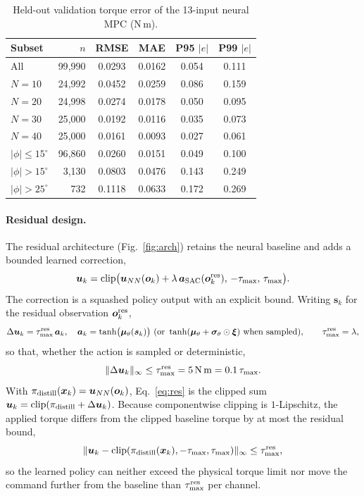 \documentclass[preprint,12pt,authoryear=false]{elsarticle}
\theoremstyle{remark}\newtheorem{remark}{Remark}
\theoremstyle{plain}\newtheorem{proposition}{Proposition}\newtheorem{lemma}{Lemma}
\theoremstyle{definition}\newtheorem{assumption}{Assumption}
\newcommand{\tmax}{\tau_{\max}}
\begin{document}
\begin{table}[t]\centering\small
\caption{Held-out validation torque error of the 13-input neural MPC (N\,m).}\label{tab:val13}
\begin{tabular}{lrcccc}\toprule
Subset & $n$ & RMSE & MAE & P95 $|e|$ & P99 $|e|$\\\midrule
All & 99{,}990 & 0.0293 & 0.0162 & 0.054 & 0.111\\
$N=10$ & 24{,}992 & 0.0452 & 0.0259 & 0.086 & 0.159\\
$N=20$ & 24{,}998 & 0.0274 & 0.0178 & 0.050 & 0.095\\
$N=30$ & 25{,}000 & 0.0192 & 0.0116 & 0.035 & 0.073\\
$N=40$ & 25{,}000 & 0.0161 & 0.0093 & 0.027 & 0.061\\
$|\phi|\le15^\circ$ & 96{,}860 & 0.0260 & 0.0151 & 0.049 & 0.100\\
$|\phi|>15^\circ$ & 3{,}130 & 0.0803 & 0.0476 & 0.143 & 0.249\\
$|\phi|>25^\circ$ & 732 & 0.1118 & 0.0633 & 0.172 & 0.269\\\bottomrule
\end{tabular}
\end{table}

\paragraph{Residual design.}
The residual architecture (Fig.~\ref{fig:arch}) retains the neural baseline and adds a bounded learned correction,
\begin{equation}
\bm u_k=\mathrm{clip}\big(\bm u_{NN}(\bm o_k)+\lambda\,\bm a_{\rm SAC}(\bm o_k^{\rm res}),\,-\tmax,\,\tmax\big).\label{eq:res}
\end{equation}
The correction is a squashed policy output with an explicit bound. Writing $\bm s_k$ for the residual observation $\bm o_k^{\rm res}$,
\begin{equation}
\Delta\bm u_k=\tau^{\rm res}_{\max}\,\bm a_k,\quad \bm a_k=\tanh\!\big(\bm\mu_\theta(\bm s_k)\big)\ \text{(or }\tanh(\bm\mu_\theta+\bm\sigma_\theta\odot\bm\xi)\text{ when sampled)},\qquad \tau^{\rm res}_{\max}=\lambda,\label{eq:dures}
\end{equation}
so that, whether the action is sampled or deterministic,
\begin{equation}
\|\Delta\bm u_k\|_\infty\le\tau^{\rm res}_{\max}=\SI{5}{N.m}=0.1\,\tau_{\max}.\label{eq:resbound}
\end{equation}
With $\pi_{\rm distill}(\bm x_k)=\bm u_{NN}(\bm o_k)$, Eq.~\eqref{eq:res} is the clipped sum $\bm u_k=\mathrm{clip}(\pi_{\rm distill}+\Delta\bm u_k)$. Because componentwise clipping is $1$-Lipschitz, the applied torque differs from the clipped baseline torque by at most the residual bound,
\begin{equation}
\|\bm u_k-\mathrm{clip}(\pi_{\rm distill}(\bm x_k),-\tmax,\tmax)\|_\infty\le\tau^{\rm res}_{\max},
\end{equation}
so the learned policy can neither exceed the physical torque limit nor move the command further from the baseline than $\tau^{\rm res}_{\max}$ per channel.
\end{document}
